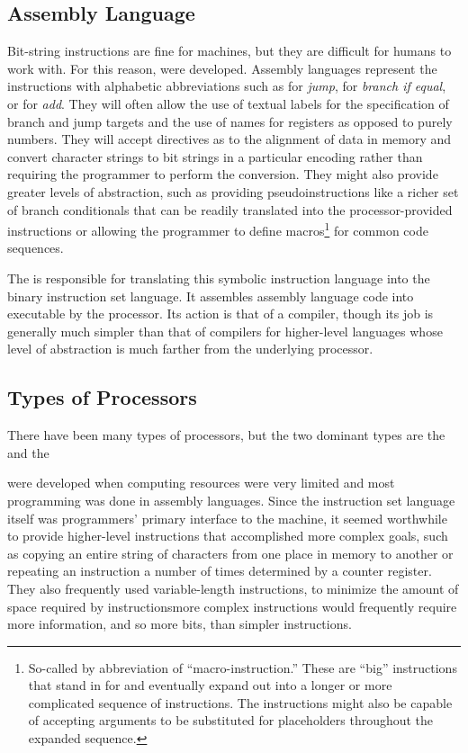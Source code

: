 \subsection{Assembly Language}
Bit-string instructions are fine for machines, but they are difficult for humans to work with. For this reason,  were developed. Assembly languages represent the instructions with alphabetic abbreviations such as  for \emph{jump},  for \emph{branch if equal}, or  for \emph{add}. They will often allow the use of textual labels for the specification of branch and jump targets and the use of names for registers as opposed to purely numbers. They will accept directives as to the alignment of data in memory and convert character strings to bit strings in a particular encoding rather than requiring the programmer to perform the conversion. They might also provide greater levels of abstraction, such as providing pseudoinstructions like a richer set of branch conditionals that can be readily translated into the processor-provided instructions or allowing the programmer to define macros\footnote{So-called by abbreviation of ``macro-instruction.'' These are ``big'' instructions that stand in for and eventually expand out into a longer or more complicated sequence of instructions. The instructions might also be capable of accepting arguments to be substituted for placeholders throughout the expanded sequence.} for common code sequences.

The  is responsible for translating this symbolic instruction language into the binary instruction set language. It assembles assembly language code into  executable by the processor. Its action is that of a compiler, though its job is generally much simpler than that of compilers for higher-level languages whose level of abstraction is much farther from the underlying processor.%

\subsection{Types of Processors}
There have been many types of processors, but the two dominant types are the  and the 

\CISCs were developed when computing resources were very limited and most programming was done in assembly languages. Since the instruction set language itself was programmers' primary interface to the machine, it seemed worthwhile to provide higher-level instructions that accomplished more complex goals, such as copying an entire string of characters from one place in memory to another or repeating an instruction a number of times determined by a counter register. They also frequently used variable-length instructions, to minimize the amount of space required by instructions\empause more complex instructions would frequently require more information, and so more bits, than simpler instructions.

